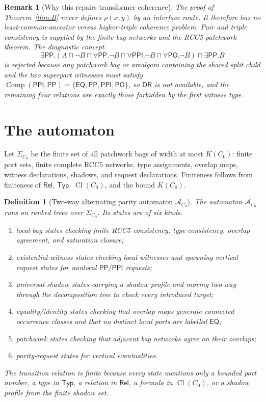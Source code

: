 \documentclass[11pt]{article}
\newtheorem{definition}[theorem]{Definition}
\newtheorem{remark}[theorem]{Remark}
\newcommand{\Rel}{\mathsf{Rel}}
\newcommand{\EQ}{\mathsf{EQ}}
\newcommand{\PP}{\mathsf{PP}}
\newcommand{\PPI}{\mathsf{PPI}}
\newcommand{\PO}{\mathsf{PO}}
\newcommand{\DR}{\mathsf{DR}}
\newcommand{\Comp}{\operatorname{Comp}}
\newcommand{\Cl}{\operatorname{Cl}}
\newcommand{\APTA}{\mathcal A}
\begin{document}
\begin{remark}[Why this repairs transformer coherence]
The proof of Theorem~\ref{thm:B} never defines $\rho(x,y)$ by an interface route.  It
therefore has no least-common-ancestor versus higher-triple coherence problem.  Pair and
triple consistency is supplied by the finite bag networks and the RCC5 patchwork theorem.
The diagnostic concept
\[
\exists\PP.(A\sqcap\neg B\sqcap\forall\PP.\neg B\sqcap\forall\PPI.\neg B\sqcap
\forall\PO.\neg B)\sqcap\exists\PP.B
\]
is rejected because any patchwork bag or amalgam containing the shared split child and
the two superpart witnesses must satisfy
$\Comp(\PPI,\PP)=\{\EQ,\PP,\PPI,\PO\}$, so $\DR$ is not available, and the remaining four
relations are exactly those forbidden by the first witness type.
\end{remark}

\section{The automaton}

Let $\Sigma_{C_0}$ be the finite set of all patchwork bags of width at most $K(C_0)$:
finite port sets, finite complete RCC5 networks, type assignments, overlap maps, witness
declarations, shadows, and request declarations.  Finiteness follows from finiteness of
$\Rel$, $\mathsf{Typ}$, $\Cl(C_0)$, and the bound $K(C_0)$.

\begin{definition}[Two-way alternating parity automaton $\APTA_{C_0}$]
The automaton $\APTA_{C_0}$ runs on ranked trees over $\Sigma_{C_0}$.  Its states are of
six kinds.
\begin{enumerate}[label=(Q\arabic*)]
\item local-bag states checking finite RCC5 consistency, type consistency, overlap
agreement, and saturation closure;
\item existential-witness states checking local witnesses and spawning vertical request
states for nonlocal $\PP/\PPI$ requests;
\item universal-shadow states carrying a shadow profile and moving two-way through the
decomposition tree to check every introduced target;
\item equality/identity states checking that overlap maps generate connected occurrence
classes and that no distinct local ports are labelled $\EQ$;
\item patchwork states checking that adjacent bag networks agree on their overlaps;
\item parity-request states for vertical eventualities.
\end{enumerate}
The transition relation is finite because every state mentions only a bounded port number,
a type in $\mathsf{Typ}$, a relation in $\Rel$, a formula in $\Cl(C_0)$, or a shadow
profile from the finite shadow set.
\end{definition}
\end{document}
